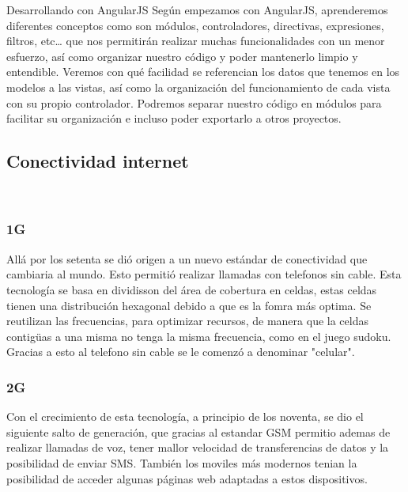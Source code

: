 \documentclass[a4paper, 11pt]{article}
\begin{document}
\begin{itemize}
            Desarrollando con AngularJS
            Según empezamos con AngularJS, aprenderemos diferentes conceptos como son
            módulos, controladores, directivas, expresiones, filtros, etc… que nos
            permitirán realizar muchas funcionalidades con un menor esfuerzo, así como
            organizar nuestro código y poder mantenerlo limpio y entendible. Veremos
            con qué facilidad se referencian los datos que tenemos en los modelos a
            las vistas, así como la organización del funcionamiento de cada vista con
            su propio controlador. Podremos separar nuestro código en módulos para
            facilitar su organización e incluso poder exportarlo a otros proyectos.


        \subsection{Conectividad internet}\\
            \subsubsection{1G}
              Allá por los setenta se dió origen a un nuevo estándar de
              conectividad que cambiaria al mundo. Esto permitió realizar llamadas con
              telefonos sin cable. Esta tecnología se basa en dividisson del
              área de cobertura en celdas, estas celdas tienen una distribución
              hexagonal debido a que es la fomra más optima. Se reutilizan las
              frecuencias, para optimizar recursos, de manera que la celdas
              contigüas a una misma no tenga la misma frecuencia, como en el
              juego sudoku. Gracias a esto al telefono sin cable se le comenzó
              a denominar "celular".\\


            \subsubsection{2G}

              Con el crecimiento de esta tecnología, a principio de los noventa,
              se dio el siguiente salto de generación, que gracias al estandar
              GSM permitio ademas de realizar llamadas de voz, tener mallor
              velocidad de transferencias de datos y la posibilidad de enviar
              SMS. También los moviles más modernos tenian la posibilidad de
              acceder algunas páginas web adaptadas a estos dispositivos.\\


\end{itemize}
\end{document}
